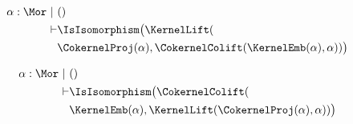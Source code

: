 \begin{sequent}
\begin{align*}
  \alpha:\Mor~|~ &() \\
  \vdash &\IsIsomorphism\big( \KernelLift( \\
  &\CokernelProj( \alpha ), \CokernelColift( \KernelEmb( \alpha ), \alpha ))\big)
\end{align*}
\end{sequent}

\begin{sequent}
\begin{align*}
  \alpha:\Mor~|~ &() \\
  \vdash &\IsIsomorphism\big( \CokernelColift( \\
  &\KernelEmb( \alpha ), \KernelLift( \CokernelProj( \alpha ), \alpha ))\big)
\end{align*}
\end{sequent}